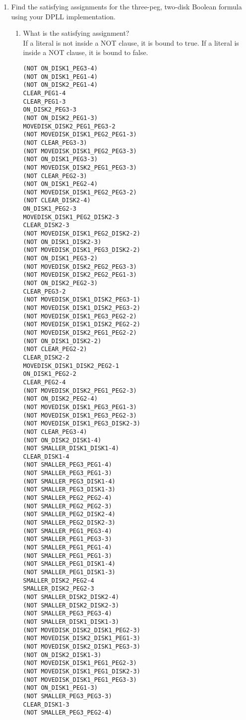 \documentclass[12pt,letterpaper]{ntdhw}
\begin{document}
\begin{enumerate}
  \item Find the satisfying assignments for the three-peg, two-disk
    Boolean formula using your DPLL implementation.
    \begin{enumerate}
    \item What is the satisfying assignment?
       \\If a literal is not inside a NOT clause, it is bound to true. If a literal is inside a NOT clause, it is bound to false.
       \begin{lstlisting}[language=pddl, style=pddlstyle,
  basicstyle=\scriptsize]
(NOT ON_DISK1_PEG3-4)
(NOT ON_DISK1_PEG1-4)
(NOT ON_DISK2_PEG1-4)
CLEAR_PEG1-4
CLEAR_PEG1-3
ON_DISK2_PEG3-3
(NOT ON_DISK2_PEG1-3)
MOVEDISK_DISK2_PEG1_PEG3-2
(NOT MOVEDISK_DISK1_PEG2_PEG1-3)
(NOT CLEAR_PEG3-3)
(NOT MOVEDISK_DISK1_PEG2_PEG3-3)
(NOT ON_DISK1_PEG3-3)
(NOT MOVEDISK_DISK2_PEG1_PEG3-3)
(NOT CLEAR_PEG2-3)
(NOT ON_DISK1_PEG2-4)
(NOT MOVEDISK_DISK1_PEG2_PEG3-2)
(NOT CLEAR_DISK2-4)
ON_DISK1_PEG2-3
MOVEDISK_DISK1_PEG2_DISK2-3
CLEAR_DISK2-3
(NOT MOVEDISK_DISK1_PEG2_DISK2-2)
(NOT ON_DISK1_DISK2-3)
(NOT MOVEDISK_DISK1_PEG3_DISK2-2)
(NOT ON_DISK1_PEG3-2)
(NOT MOVEDISK_DISK2_PEG2_PEG3-3)
(NOT MOVEDISK_DISK2_PEG2_PEG1-3)
(NOT ON_DISK2_PEG2-3)
CLEAR_PEG3-2
(NOT MOVEDISK_DISK1_DISK2_PEG3-1)
(NOT MOVEDISK_DISK1_DISK2_PEG3-2)
(NOT MOVEDISK_DISK1_PEG3_PEG2-2)
(NOT MOVEDISK_DISK1_DISK2_PEG2-2)
(NOT MOVEDISK_DISK2_PEG1_PEG2-2)
(NOT ON_DISK1_DISK2-2)
(NOT CLEAR_PEG2-2)
CLEAR_DISK2-2
MOVEDISK_DISK1_DISK2_PEG2-1
ON_DISK1_PEG2-2
CLEAR_PEG2-4
(NOT MOVEDISK_DISK2_PEG1_PEG2-3)
(NOT ON_DISK2_PEG2-4)
(NOT MOVEDISK_DISK1_PEG3_PEG1-3)
(NOT MOVEDISK_DISK1_PEG3_PEG2-3)
(NOT MOVEDISK_DISK1_PEG3_DISK2-3)
(NOT CLEAR_PEG3-4)
(NOT ON_DISK2_DISK1-4)
(NOT SMALLER_DISK1_DISK1-4)
CLEAR_DISK1-4
(NOT SMALLER_PEG3_PEG1-4)
(NOT SMALLER_PEG3_PEG1-3)
(NOT SMALLER_PEG3_DISK1-4)
(NOT SMALLER_PEG3_DISK1-3)
(NOT SMALLER_PEG2_PEG2-4)
(NOT SMALLER_PEG2_PEG2-3)
(NOT SMALLER_PEG2_DISK2-4)
(NOT SMALLER_PEG2_DISK2-3)
(NOT SMALLER_PEG1_PEG3-4)
(NOT SMALLER_PEG1_PEG3-3)
(NOT SMALLER_PEG1_PEG1-4)
(NOT SMALLER_PEG1_PEG1-3)
(NOT SMALLER_PEG1_DISK1-4)
(NOT SMALLER_PEG1_DISK1-3)
SMALLER_DISK2_PEG2-4
SMALLER_DISK2_PEG2-3
(NOT SMALLER_DISK2_DISK2-4)
(NOT SMALLER_DISK2_DISK2-3)
(NOT SMALLER_PEG3_PEG3-4)
(NOT SMALLER_DISK1_DISK1-3)
(NOT MOVEDISK_DISK2_DISK1_PEG2-3)
(NOT MOVEDISK_DISK2_DISK1_PEG1-3)
(NOT MOVEDISK_DISK2_DISK1_PEG3-3)
(NOT ON_DISK2_DISK1-3)
(NOT MOVEDISK_DISK1_PEG1_PEG2-3)
(NOT MOVEDISK_DISK1_PEG1_DISK2-3)
(NOT MOVEDISK_DISK1_PEG1_PEG3-3)
(NOT ON_DISK1_PEG1-3)
(NOT SMALLER_PEG3_PEG3-3)
CLEAR_DISK1-3
(NOT SMALLER_PEG3_PEG2-4)

\end{lstlisting}
\end{enumerate}
\end{enumerate}
\end{document}
